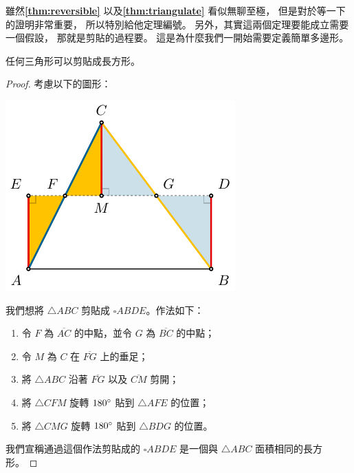 \documentclass{article}
\begin{document}
\begin{multicols}{2}
\begin{remark}
	雖然\textbf{\autoref{thm:reversible}} 以及\textbf{\autoref{thm:triangulate}} 看似無聊至極，
	但是對於等一下的證明非常重要，
	所以特別給他定理編號。
	另外，其實這兩個定理要能成立需要一個假設，
	那就是剪貼的過程要。
	這是為什麼我們一開始需要定義簡單多邊形。
\end{remark}

\begin{theorem}\label{thm:triangle-to-rectangle}
	任何三角形可以剪貼成長方形。
\end{theorem}
\begin{proof}
	考慮以下的圖形：
	\begin{center}
		\includegraphics[scale=1]{figures/figure-triangle_to_rectangle.pdf}
	\end{center}
	我們想將 $\triangle{ABC}$ 剪貼成 $\square{ABDE}$。作法如下：
	\begin{enumerate}
		\item 令 $F$ 為 $\overline{AC}$ 的中點，並令 $G$ 為 $\overline{BC}$ 的中點；
		\item 令 $M$ 為 $C$ 在 $\overline{FG}$ 上的垂足；
		\item 將 $\triangle{ABC}$ 沿著 $\overline{FG}$ 以及 $\overline{CM}$ 剪開；
		\item 將 $\triangle{CFM}$ 旋轉 $180^{\circ}$ 貼到 $\triangle{AFE}$ 的位置；
		\item 將 $\triangle{CMG}$ 旋轉 $180^{\circ}$ 貼到 $\triangle{BDG}$ 的位置。
	\end{enumerate}
	我們宣稱通過這個作法剪貼成的 $\square{ABDE}$ 是一個與 $\triangle{ABC}$ 面積相同的長方形。


\end{proof}
\end{multicols}
\end{document}
